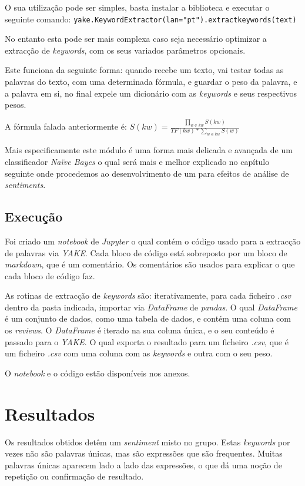 O sua utilização pode ser simples, basta instalar a biblioteca e executar o seguinte comando: \texttt{yake.KeywordExtractor(lan="pt").extract\textunderscore keywords(text)}

No entanto esta pode ser mais complexa caso seja necessário optimizar a extracção de \textit{keywords}, com os seus variados parâmetros opcionais.

Este funciona da seguinte forma: quando recebe um texto, vai testar todas as palavras do texto, com uma determinada fórmula, e guardar o peso da palavra, e a palavra em si, no final expele um dicionário com as \textit{keywords} e seus respectivos pesos.

A fórmula falada anteriormente é:
\begin{math}
    S(kw) = \frac{\prod_{w \in kw}^{} S(kw)}{TF(kw) * \sum_{w \in kw}^{}S(w)}
\end{math}

Mais especificamente este módulo é uma forma mais delicada e avançada de um classificador \textit{Naïve Bayes} \cite{tamgh1} \cite{tamyt1} \cite{tamyt2} \cite{tamyt3} o qual será mais e melhor explicado no capítulo seguinte onde procedemos ao desenvolvimento de um para efeitos de análise de \textit{sentiments}.

\subsection{Execução}

Foi criado um \textit{notebook} de \textit{Jupyter} o qual contém o código usado para a extracção de palavras via \textit{YAKE}. Cada bloco de código está sobreposto por um bloco de \textit{markdown}, que é um comentário. Os comentários são usados para explicar o que cada bloco de código faz.

As rotinas de extracção de \textit{keywords} são: iterativamente, para cada ficheiro \textit{.csv} dentro da pasta indicada, importar via \textit{DataFrame} de \textit{pandas}. O qual \textit{DataFrame} é um conjunto de dados, como uma tabela de dados, e contém uma coluna com os \textit{reviews}. O \textit{DataFrame} é iterado na sua coluna única, e o seu conteúdo é passado para o \textit{YAKE}. O qual exporta o resultado para um ficheiro \textit{.csv}, que é um ficheiro \textit{.csv} com uma coluna com as \textit{keywords} e outra com o seu peso.

O \textit{notebook} e o código estão disponíveis nos anexos.

\section{Resultados}

Os resultados obtidos detêm um \textit{sentiment} misto no grupo. Estas \textit{keywords} por vezes não são palavras únicas, mas são expressões que são frequentes. Muitas palavras únicas aparecem lado a lado das expressões, o que dá uma noção de repetição ou confirmação de resultado.
